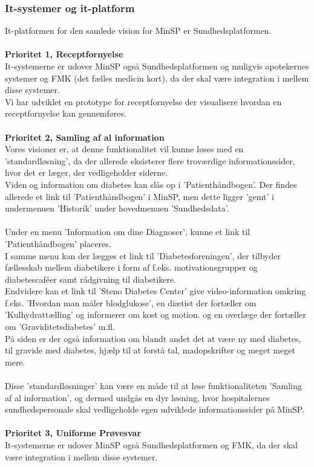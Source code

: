 \subsubsection{It-systemer og it-platform}
It-platformen for den samlede vision for MinSP er Sundhedsplatformen.
\\\\
\textbf{Prioritet 1, Receptfornyelse} \\
It-systemerne er udover MinSP også Sundhedsplatformen og muligvis apotekernes systemer og FMK (det fælles medicin kort), da der skal være integration i mellem disse systemer.\\
Vi har udviklet en prototype for receptfornyelse der visualisere hvordan en receptfornyelse kan gennemføres.
\\\\
\textbf{Prioritet 2, Samling af al information} \\
%
%
Vores visioner er, at denne funktionalitet vil kunne løses med en 'standardløsning', da der allerede eksisterer flere troværdige informationssider, hvor det er læger, der vedligeholder siderne. \\
Viden og information om diabetes kan slås op i 'Patienthåndbogen'. Der findes allerede et link til 'Patienthåndbogen' i MinSP, men dette ligger 'gemt' i undermenuen 'Historik' under hovedmenuen 'Sundhedsdata'.
\\ \\
Under en menu 'Information om dine Diagnoser', kunne et link til 'Patienthåndbogen' placeres. \\
I samme menu kan der lægges et link til 'Diabetesforeningen', der tilbyder fællesskab mellem diabetikere i form af f.eks. motivationsgrupper og diabetescaféer samt rådgivning til diabetikere.
\\
Endvidere kan et link til 'Steno Diabetes Center' give video-information omkring f.eks. 'Hvordan man måler blodglukose', en diætist der fortæller om 'Kulhydrattælling' og informerer om kost og motion. og en overlæge der fortæller om 'Graviditetsdiabetes' m.fl. \\
På siden er der også information om blandt andet det at være ny med diabetes, til gravide med diabetes, hjælp til at forstå tal, madopskrifter og meget meget mere. 
\\ \\
Disse 'standardløsninger' kan være en måde til at løse funktionaliteten 'Samling af al information', og dermed undgås en dyr løsning, hvor hospitalernes sundhedspersonale skal vedligeholde egen udviklede informationssider på MinSP.
\\\\
\textbf{Prioritet 3, Uniforme Prøvesvar} \\
It-systemerne er udover MinSP også Sundhedsplatformen og FMK, da der skal være integration i mellem disse systemer.

